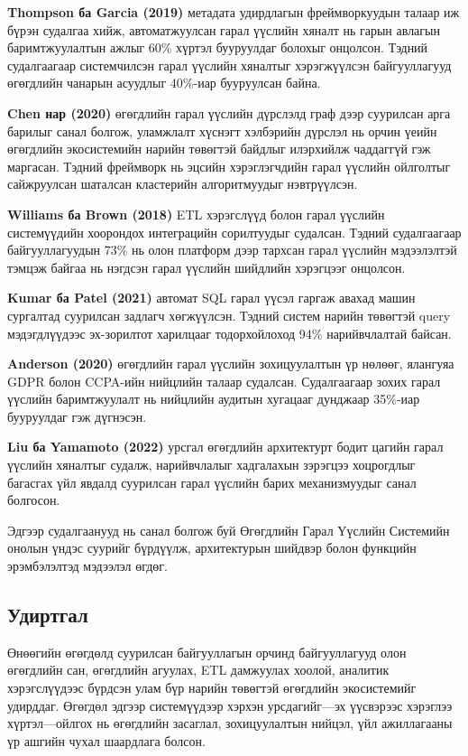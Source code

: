 \textbf{Thompson ба Garcia (2019)} метадата удирдлагын фреймворкуудын талаар иж бүрэн судалгаа хийж, автоматжуулсан гарал үүслийн хяналт нь гарын авлагын баримтжуулалтын ажлыг 60\% хүртэл бууруулдаг болохыг онцолсон. Тэдний судалгаагаар системчилсэн гарал үүслийн хяналтыг хэрэгжүүлсэн байгууллагууд өгөгдлийн чанарын асуудлыг 40\%-иар бууруулсан байна.

\textbf{Chen нар (2020)} өгөгдлийн гарал үүслийн дүрслэлд граф дээр суурилсан арга барилыг санал болгож, уламжлалт хүснэгт хэлбэрийн дүрслэл нь орчин үеийн өгөгдлийн экосистемийн нарийн төвөгтэй байдлыг илэрхийлж чаддаггүй гэж маргасан. Тэдний фреймворк нь эцсийн хэрэглэгчдийн гарал үүслийн ойлголтыг сайжруулсан шаталсан кластерийн алгоритмуудыг нэвтрүүлсэн.

\textbf{Williams ба Brown (2018)} ETL хэрэгслүүд болон гарал үүслийн системүүдийн хоорондох интеграцийн сорилтуудыг судалсан. Тэдний судалгаагаар байгууллагуудын 73\% нь олон платформ дээр тархсан гарал үүслийн мэдээлэлтэй тэмцэж байгаа нь нэгдсэн гарал үүслийн шийдлийн хэрэгцээг онцолсон.

\textbf{Kumar ба Patel (2021)} автомат SQL гарал үүсэл гаргаж авахад машин сургалтад суурилсан задлагч хөгжүүлсэн. Тэдний систем нарийн төвөгтэй query мэдэгдлүүдээс эх-зорилтот харилцааг тодорхойлоход 94\% нарийвчлалтай байсан.

\textbf{Anderson (2020)} өгөгдлийн гарал үүслийн зохицуулалтын үр нөлөөг, ялангуяа GDPR болон CCPA-ийн нийцлийн талаар судалсан. Судалгаагаар зохих гарал үүслийн баримтжуулалт нь нийцлийн аудитын хугацааг дунджаар 35\%-иар бууруулдаг гэж дүгнэсэн.

\textbf{Liu ба Yamamoto (2022)} урсгал өгөгдлийн архитектурт бодит цагийн гарал үүслийн хяналтыг судалж, нарийвчлалыг хадгалахын зэрэгцээ хоцрогдлыг багасгах үйл явдалд суурилсан гарал үүслийн барих механизмуудыг санал болгосон.

Эдгээр судалгаанууд нь санал болгож буй Өгөгдлийн Гарал Үүслийн Системийн онолын үндэс суурийг бүрдүүлж, архитектурын шийдвэр болон функцийн эрэмбэлэлтэд мэдээлэл өгдөг.

\subsection{Удиртгал}
\label{subsec:dl_introduction}

Өнөөгийн өгөгдөлд суурилсан байгууллагын орчинд байгууллагууд олон өгөгдлийн сан, өгөгдлийн агуулах, ETL дамжуулах хоолой, аналитик хэрэгслүүдээс бүрдсэн улам бүр нарийн төвөгтэй өгөгдлийн экосистемийг удирддаг. Өгөгдөл эдгээр системүүдээр хэрхэн урсдагийг---эх үүсвэрээс хэрэглээ хүртэл---ойлгох нь өгөгдлийн засаглал, зохицуулалтын нийцэл, үйл ажиллагааны үр ашгийн чухал шаардлага болсон.

